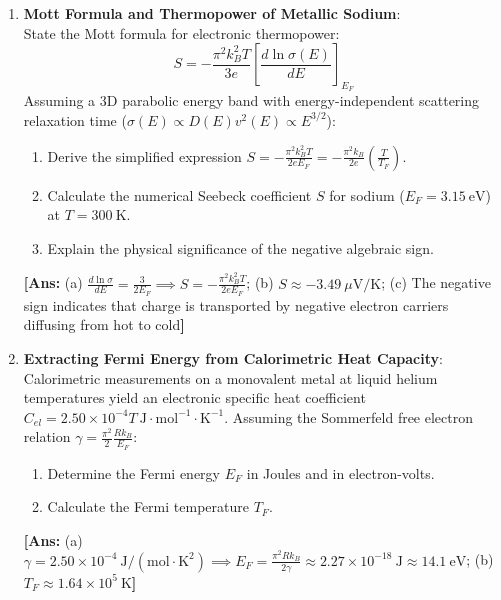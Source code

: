 \documentclass[11pt,a4paper]{article}
\begin{document}
\begin{enumerate}[label=\textbf{\arabic*.}, resume, leftmargin=*]
    \item \textbf{Mott Formula and Thermopower of Metallic Sodium}:\\
    State the Mott formula for electronic thermopower:
    \[
    S = -\frac{\pi^2 k_B^2 T}{3e}\left[\frac{d\ln\sigma(E)}{dE}\right]_{E_F}
    \]
    Assuming a 3D parabolic energy band with energy-independent scattering relaxation time ($\sigma(E) \propto D(E)v^2(E) \propto E^{3/2}$):
    \begin{enumerate}[label=(\alph*)]
        \item Derive the simplified expression $S = -\frac{\pi^2 k_B^2 T}{2e E_F} = -\frac{\pi^2 k_B}{2e}\left(\frac{T}{T_F}\right)$.
        \item Calculate the numerical Seebeck coefficient $S$ for sodium ($E_F = 3.15\ \mathrm{eV}$) at $T = 300\ \mathrm{K}$.
        \item Explain the physical significance of the negative algebraic sign.
    \end{enumerate}
    \textbf{[Ans:} (a) $\frac{d\ln\sigma}{dE} = \frac{3}{2E_F} \implies S = -\frac{\pi^2 k_B^2 T}{2e E_F}$; (b) $S \approx -3.49\ \mu\mathrm{V/K}$; (c) The negative sign indicates that charge is transported by negative electron carriers diffusing from hot to cold\textbf{]}

    \item \textbf{Extracting Fermi Energy from Calorimetric Heat Capacity}:\\
    Calorimetric measurements on a monovalent metal at liquid helium temperatures yield an electronic specific heat coefficient $C_{el} = 2.50 \times 10^{-4} T\ \mathrm{J\cdot mol^{-1}\cdot K^{-1}}$. Assuming the Sommerfeld free electron relation $\gamma = \frac{\pi^2}{2}\frac{R k_B}{E_F}$:
    \begin{enumerate}[label=(\alph*)]
        \item Determine the Fermi energy $E_F$ in Joules and in electron-volts.
        \item Calculate the Fermi temperature $T_F$.
    \end{enumerate}
    \textbf{[Ans:} (a) $\gamma = 2.50 \times 10^{-4}\ \mathrm{J/(mol\cdot K^2)} \implies E_F = \frac{\pi^2 R k_B}{2\gamma} \approx 2.27 \times 10^{-18}\ \mathrm{J} \approx 14.1\ \mathrm{eV}$; (b) $T_F \approx 1.64 \times 10^5\ \mathrm{K}$\textbf{]}


\end{enumerate}
\end{document}
